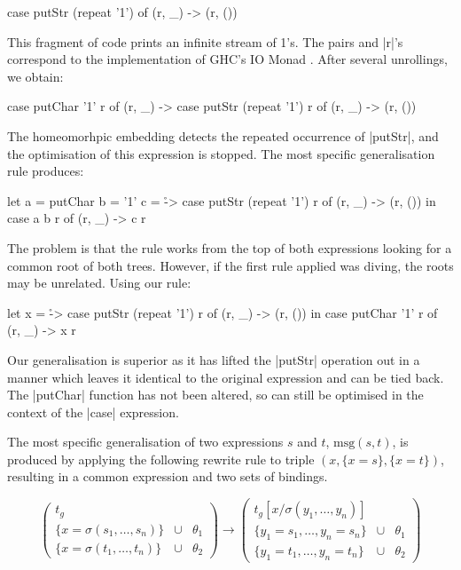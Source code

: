 \documentclass{llncs}
\begin{document}
\begin{code}
case  putStr (repeat '1') of
      (r, _) -> (r, ())
\end{code}

This fragment of code prints an infinite stream of 1's. The pairs and |r|'s correspond to the implementation of GHC's IO Monad \cite{spj:awkward_squad}. After several unrollings, we obtain:

\begin{code}
case  putChar '1' r of
      (r, _) -> case  putStr (repeat '1') r of
                      (r, _) -> (r, ())
\end{code}

The homeomorhpic embedding detects the repeated occurrence of |putStr|, and the optimisation of this expression is stopped. The most specific generalisation rule produces:

\begin{code}
let  a = putChar
     b = '1'
     c = \r -> case  putStr (repeat '1') r of
                     (r, _) -> (r, ())
in case  a b r of
         (r, _) -> c r
\end{code}

The problem is that the rule works from the top of both expressions looking for a common root of both trees. However, if the first rule applied was diving, the roots may be unrelated. Using our rule:

\begin{code}
let x = \r -> case  putStr (repeat '1') r of
                    (r, _) -> (r, ())
in case  putChar '1' r of
         (r, _) -> x r
\end{code}

Our generalisation is superior as it has lifted the |putStr| operation out in a manner which leaves it identical to the original expression and can be tied back. The |putChar| function has not been altered, so can still be optimised in the context of the |case| expression.

The most specific generalisation of two expressions $s$ and $t$, $\text{msg}(s,t)$, is produced by applying the following rewrite rule to triple $(x,\{x=s\},\{x=t\})$, resulting in a common expression and two sets of bindings.

\[
\left( \begin{array}{lcl}
	t_g \\
	\{x = \sigma(s_1,\ldots,s_n)\} & \cup & \theta_1 \\
	\{x = \sigma(t_1,\ldots,t_n)\} & \cup & \theta_2
	\end{array} \right)
\rightarrow
\left( \begin{array}{lcl}
	t_g[x / \sigma(y_1,\ldots,y_n)] \\
	\{y_1 = s_1,\ldots,y_n = s_n\} & \cup & \theta_1 \\
	\{y_1 = t_1,\ldots,y_n = t_n\} & \cup & \theta_2
	\end{array} \right)
\]
\end{document}
